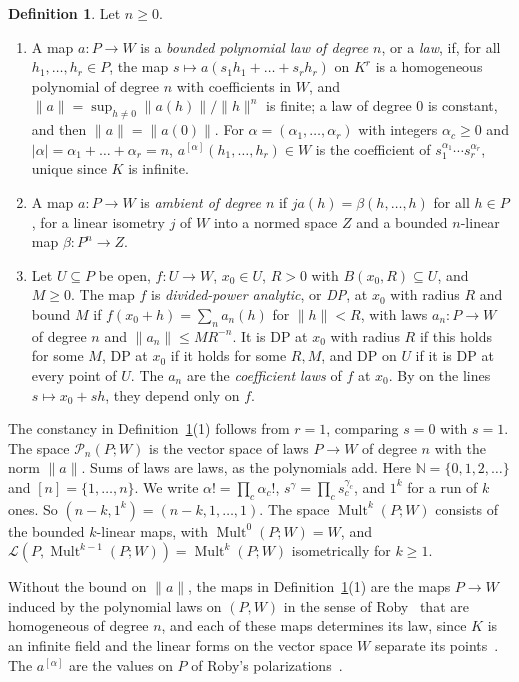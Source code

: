 \documentclass[11pt]{amsart}
\theoremstyle{definition}
\newtheorem{definition}[theorem]{Definition}
\theoremstyle{remark}
\numberwithin{equation}{section}
\newcommand{\N}{\mathbb N}
\newcommand{\cL}{\mathcal L}
\newcommand{\Mult}{\operatorname{Mult}}
\newcommand{\abs}[1]{\lvert #1\rvert}
\newcommand{\norm}[1]{\lVert #1\rVert}
\theoremstyle{plain}
\theoremstyle{definition}
\theoremstyle{plain}
\newcommand{\cP}{\mathcal P}
\begin{document}
\begin{definition}\label{dp:def:laws}
Let $n\ge0$.
\begin{enumerate}
\item A map $a\colon P\to W$ is a \emph{bounded polynomial law of degree $n$}, or a \emph{law}, if, for all $h_1,\dots,h_r\in P$, the map $s\mapsto a(s_1h_1+\dots+s_rh_r)$ on $K^r$ is a homogeneous polynomial of degree $n$ with coefficients in $W$, and $\norm a=\sup_{h\ne0}\norm{a(h)}/\norm h^n$ is finite; a law of degree $0$ is constant, and then $\norm a=\norm{a(0)}$. For $\alpha=(\alpha_1,\dots,\alpha_r)$ with integers $\alpha_c\ge0$ and $\abs\alpha=\alpha_1+\dots+\alpha_r=n$, $a^{[\alpha]}(h_1,\dots,h_r)\in W$ is the coefficient of $s_1^{\alpha_1}\cdots s_r^{\alpha_r}$, unique since $K$ is infinite.
\item A map $a\colon P\to W$ is \emph{ambient of degree $n$} if $ja(h)=\beta(h,\dots,h)$ for all $h\in P$, for a linear isometry $j$ of $W$ into a normed space $Z$ and a bounded $n$\nobreakdash-linear map $\beta\colon P^n\to Z$.
\item Let $U\subseteq P$ be open, $f\colon U\to W$, $x_0\in U$, $R>0$ with $B(x_0,R)\subseteq U$, and $M\ge0$. The map $f$ is \emph{divided-power analytic}, or \emph{DP}, at $x_0$ with radius $R$ and bound $M$ if $f(x_0+h)=\sum_na_n(h)$ for $\norm h<R$, with laws $a_n\colon P\to W$ of degree $n$ and $\norm{a_n}\le MR^{-n}$. It is DP at $x_0$ with radius $R$ if this holds for some $M$, DP at $x_0$ if it holds for some $R,M$, and DP on $U$ if it is DP at every point of $U$. The $a_n$ are the \emph{coefficient laws} of $f$ at $x_0$. By \cite[Lemma~A.1]{I} on the lines $s\mapsto x_0+sh$, they depend only on $f$.
\end{enumerate}
\end{definition}

The constancy in Definition~\ref{dp:def:laws}(1) follows from $r=1$, comparing $s=0$ with $s=1$. The space $\cP_n(P;W)$ is the vector space of laws $P\to W$ of degree $n$ with the norm $\norm a$. Sums of laws are laws, as the polynomials add. Here $\N=\{0,1,2,\dots\}$ and $[n]=\{1,\dots,n\}$. We write $\alpha!=\prod_c\alpha_c!$, $s^\gamma=\prod_cs_c^{\gamma_c}$, and $1^k$ for a run of $k$ ones. So $(n-k,1^k)=(n-k,1,\dots,1)$. The space $\Mult^k(P;W)$ consists of the bounded $k$\nobreakdash-linear maps, with $\Mult^0(P;W)=W$, and $\cL(P,\Mult^{k-1}(P;W))=\Mult^k(P;W)$ isometrically for $k\ge1$.

Without the bound on $\norm a$, the maps in Definition~\ref{dp:def:laws}(1) are the maps $P\to W$ induced by the polynomial laws on $(P,W)$ in the sense of Roby~\cite{Ro} that are homogeneous of degree $n$, and each of these maps determines its law, since $K$ is an infinite field and the linear forms on the vector space $W$ separate its points~\cite[Th.~I.1, Props.~I.1, I.8, IV.6, IV.7]{Ro}. The $a^{[\alpha]}$ are the values on $P$ of Roby's polarizations~\cite[II~\S1]{Ro}.
\end{document}

